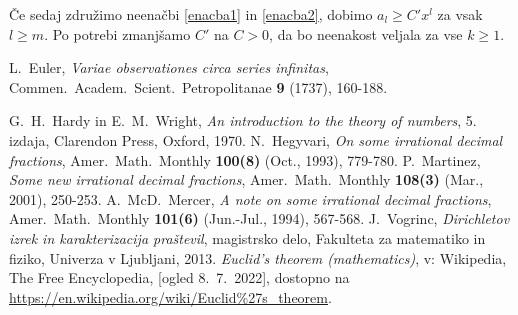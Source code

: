 \documentclass[twoside,11pt]{article}
\begin{document}
Če sedaj združimo neenačbi \ref{enacba1} in \ref{enacba2}, dobimo 
$a_l \geq C'x^l$ za vsak $l \geq m$.
Po potrebi zmanjšamo $C'$ na $C>0$, da bo neenakost veljala
za vse $k \geq 1$.

\QED







\begin{thebibliography}{1}
    L.~Euler, \emph{Variae observationes circa series infinitas},
    Commen.~Academ.~Scient.~Petropolitanae \textbf{9} (1737), 160-188.

    G.~H.~Hardy in E.~M.~Wright, \emph{An introduction to the theory of numbers}, 
    5. izdaja, Clarendon Press, Oxford, 1970.
    N.~Hegyvari, \emph{On some irrational decimal fractions},
    Amer.~Math.~Monthly \textbf{100(8)}  (Oct., 1993),  779-780.
    P.~Martinez, \emph{Some new irrational decimal fractions},
    Amer.~Math.~Monthly \textbf{108(3)}  (Mar., 2001),  250-253.
    A.~McD.~Mercer, \emph{A note on some irrational decimal fractions},
    Amer.~Math.~Monthly \textbf{101(6)}  (Jun.-Jul., 1994),  567-568.
    J.~Vogrinc, \emph{Dirichletov izrek in karakterizacija praštevil}, 
    magistrsko delo, Fakulteta za matematiko in fiziko, Univerza v Ljubljani, 2013.
    \emph{Euclid's theorem (mathematics)}, v: Wikipedia, The Free Encyclopedia, [ogled 8.~7.~2022], 
    dostopno na \url{https://en.wikipedia.org/wiki/Euclid%27s_theorem}.
    
\end{thebibliography}
\end{document}
